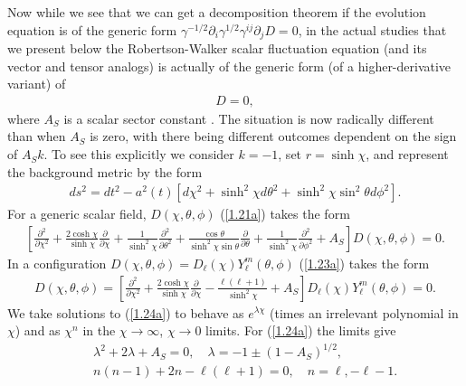 \documentclass[aps,onecolumn,10pt]{revtex4}
\numberwithin{equation}{section}
\numberwithin{equation}{section}
\begin{document}
Now while we see that we can get a decomposition theorem if the evolution equation is of the generic form $\gamma^{-1/2}\partial_i\gamma^{1/2}\gamma^{ij}\partial_jD=0$, in the actual studies that we present below the Robertson-Walker scalar fluctuation equation (and its vector and tensor analogs) is actually of the generic form (of a higher-derivative variant) of
%
\begin{align}
[\gamma^{-1/2}\partial_i\gamma^{1/2}\gamma^{ij}\partial_j-A_Sk]D=0,
\label{1.21a}
\end{align}
%
where $A_S$ is a scalar sector constant \cite{footnote1}. The situation is now radically different than when $A_S$ is zero, with there being different outcomes dependent on the sign of $A_Sk$. To see this explicitly we consider $k=-1$, set $r=\sinh\chi$, and represent the background metric by the form
%
\begin{eqnarray}
ds^2= dt^2-a^2(t)[d\chi^2+\sinh^2\chi d\theta^2+\sinh^2\chi\sin^2\theta d\phi^2].
\label{1.22a}
\end{eqnarray}
%
For a generic scalar field, $D(\chi,\theta,\phi)$  (\ref{1.21a}) takes the form 
%
\begin{eqnarray}
\left[ \frac{\partial^2}{\partial\chi^2}+\frac{2\cosh\chi}{\sinh\chi}\frac{\partial}{\partial\chi}+\frac{1}{\sinh^2\chi}\frac{\partial^2}{\partial\theta^2}+\frac{\cos\theta}{\sinh^2\chi\sin\theta}\frac{\partial}{\partial\theta}+\frac{1}{\sinh^2\chi}\frac{\partial^2}{\partial\phi^2}+A_S\right]D(\chi,\theta,\phi)=0.
\label{1.23a}
\end{eqnarray}
%
In a configuration $D(\chi,\theta,\phi)=D_{\ell}(\chi)Y_{\ell}^m(\theta,\phi)$ (\ref{1.23a}) takes the form 
%
\begin{eqnarray}
[\gamma^{-1/2}\partial_i\gamma^{1/2}\gamma^{ij}\partial_j+A_S]D(\chi,\theta,\phi)=\left[ \frac{\partial^2}{\partial\chi^2}+\frac{2\cosh\chi}{\sinh\chi}\frac{\partial}{\partial\chi}-\frac{\ell(\ell+1)}{\sinh^2\chi}+A_S\right]D_{\ell}(\chi)Y_{\ell}^m(\theta,\phi)=0.
\label{1.24a}
\end{eqnarray}
%
We take solutions to (\ref{1.24a}) to behave as $e^{\lambda\chi}$ (times an irrelevant polynomial in $\chi$) and as $\chi^n$ in the $\chi\rightarrow \infty$, $\chi\rightarrow 0$ limits. For (\ref{1.24a}) the limits give
%
\begin{eqnarray}
&&\lambda^2+2\lambda+A_S=0,\quad \lambda=-1\pm(1-A_S)^{1/2},
\nonumber\\
&&n(n-1)+2n-\ell(\ell+1)=0,\quad n=\ell, -\ell-1.
\label{1.25a}
\end{eqnarray}
\end{document}
